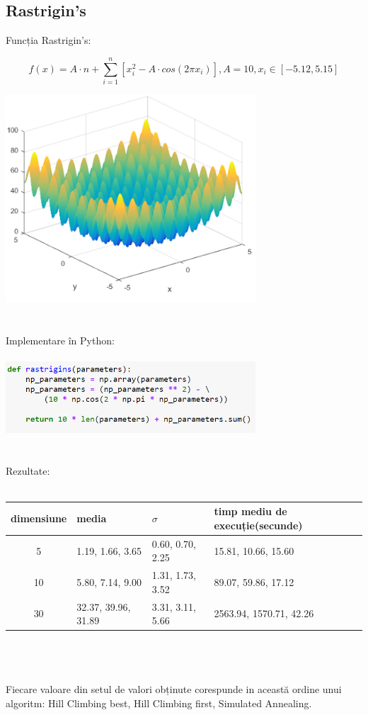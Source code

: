 \documentclass{article}
\begin{document}
\subsection*{Rastrigin's}
Funcția Rastrigin's:

$$ f(x) = A \cdot n + \sum_{i=1}^n \left[ x_i^2 - A \cdot cos(2 \pi x_i) \right],
A = 10, x_i \in \left[ -5.12, 5.15 \right]$$

\includegraphics[width=0.7\textwidth]{rastrigin}\\\\\\
Implementare în Python:\\\\
\includegraphics[width=0.7\textwidth]{4c}\\\\\\
Rezultate:\\\\
\begin{tabular}{||c|||l|l|l||}
  \hline
  dimensiune & media & $\sigma$ & timp mediu de execuție(secunde)\\ \hline \hline
  5	  & 1.19, 1.66, 3.65 & 0.60, 0.70, 2.25 & 15.81, 10.66, 15.60 \\ \hline
  10  & 5.80, 7.14, 9.00 & 1.31, 1.73, 3.52 & 89.07, 59.86, 17.12 \\ \hline
  30  & 32.37, 39.96, 31.89 & 3.31, 3.11, 5.66 & 2563.94, 1570.71, 42.26 \\ \hline
\end{tabular}\\\\\\
Fiecare valoare din setul de valori obținute corespunde in această ordine unui algoritm: Hill Climbing best, Hill Climbing first, Simulated Annealing.
\end{document}
